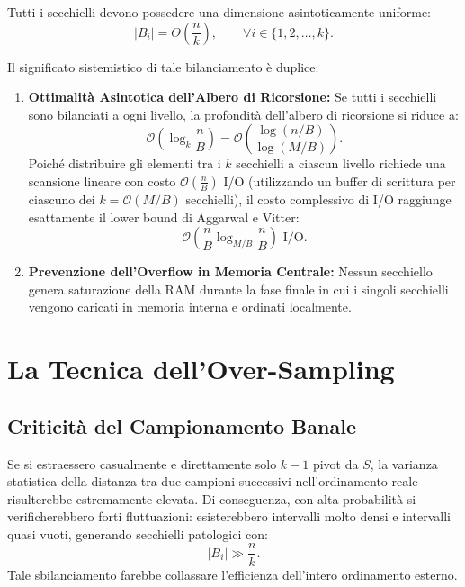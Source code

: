 \begin{property}
Tutti i secchielli devono possedere una dimensione asintoticamente uniforme:
\begin{equation}
  |B_i| = \Theta\left(\frac{n}{k}\right), \qquad \forall i \in \{1, 2, \dots, k\}.
\end{equation}
\end{property}

Il significato sistemistico di tale bilanciamento è duplice:
\begin{enumerate}
  \item \textbf{Ottimalità Asintotica dell'Albero di Ricorsione:} Se tutti i secchielli sono bilanciati a ogni livello, la profondità dell'albero di ricorsione si riduce a:
  \begin{equation}
    \mathcal{O}\left(\log_k \frac{n}{B}\right) = \mathcal{O}\left(\frac{\log(n/B)}{\log(M/B)}\right).
  \end{equation}
  Poiché distribuire gli elementi tra i $k$ secchielli a ciascun livello richiede una scansione lineare con costo $\mathcal{O}\left(\frac{n}{B}\right)$ I/O (utilizzando un buffer di scrittura per ciascuno dei $k = \mathcal{O}(M/B)$ secchielli), il costo complessivo di I/O raggiunge esattamente il lower bound di Aggarwal e Vitter:
  \begin{equation}
    \mathcal{O}\left(\frac{n}{B} \log_{M/B} \frac{n}{B}\right) \text{ I/O}.
  \end{equation}
  \item \textbf{Prevenzione dell'Overflow in Memoria Centrale:} Nessun secchiello genera saturazione della RAM durante la fase finale in cui i singoli secchielli vengono caricati in memoria interna e ordinati localmente.
\end{enumerate}

\FloatBarrier
\section{La Tecnica dell'Over-Sampling}
\label{sec:oversampling-technique}

\subsection{Criticità del Campionamento Banale}
Se si estraessero casualmente e direttamente solo $k - 1$ pivot da $S$, la varianza statistica della distanza tra due campioni successivi nell'ordinamento reale risulterebbe estremamente elevata. Di conseguenza, con alta probabilità si verificherebbero forti fluttuazioni: esisterebbero intervalli molto densi e intervalli quasi vuoti, generando secchielli patologici con:
\begin{equation}
  |B_i| \gg \frac{n}{k}.
\end{equation}
Tale sbilanciamento farebbe collassare l'efficienza dell'intero ordinamento esterno.


